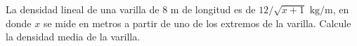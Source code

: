 \item La densidad lineal de una varilla de $8 \text{ m}$ de longitud es de $12 / \sqrt{x + 1} \text{ kg/m}$, en donde $x$ se mide en metros a partir de uno de los extremos de la varilla. Calcule la densidad media de la varilla.
